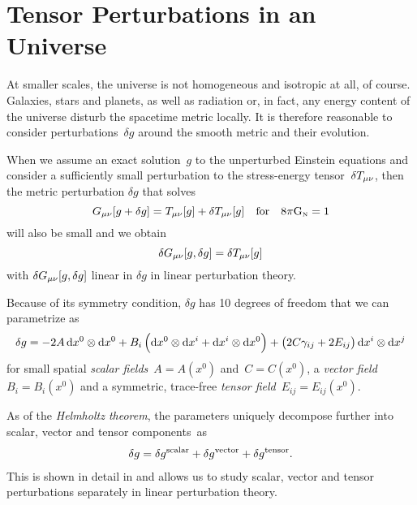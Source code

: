 \documentclass[12pt,parskip=half]{scrreprt}
\newcommand{\todocheck}[1]{\todo[color=blue!40]{#1}}
\begin{document}
\section{Tensor Perturbations in an \FLRW Universe}\label{sec:perturb}

At smaller scales, the universe is not homogeneous and isotropic at all, of course. Galaxies, stars and planets, as well as radiation or, in fact, any energy content of the universe disturb the spacetime metric locally. It is therefore reasonable to consider perturbations~\(\delta g\) around the smooth \FLRW metric and their evolution.

When we assume an exact solution~\(g\) to the unperturbed Einstein equations and consider a sufficiently small perturbation to the stress-energy tensor~\(\delta T_{\mu \nu}\), then the metric perturbation \(\delta g\) that solves
\begin{equation}
	G_{\mu \nu}[g + \delta g] = T_{\mu \nu}[g] + \delta T_{\mu \nu}[g] \quad \text{for} \quad 8 \pi \mathrm{G}_\textnormal{\tiny{N}} = 1
\end{equation}
will also be small and we obtain \autocite{Schulz}
\begin{equation}\label{eq:perturbed_einstein_eqns}
	\delta G_{\mu \nu}[g,\delta g] = \delta T_{\mu \nu}[g]
\end{equation}
with \(\delta G_{\mu \nu}[g,\delta g]\) linear in \(\delta g\) in linear perturbation theory.

Because of its symmetry condition, \(\delta g\) has 10 degrees of freedom that we can parametrize as \autocite{Schulz}
\begin{align}
	\delta g = -2A \dif{x^0}\otimes\dif{x^0} + B_i\del{\dif{x^0}\otimes\dif{x^i}+\dif{x^i}\otimes\dif{x^0}} + \del{2C\gamma_{ij} + 2E_{ij}}\dif{x^i}\otimes\dif{x^j}
\end{align}\todocheck{notation}
for small spatial \emph{scalar fields}~\(A=A(x^0)\) and~\(C=C(x^0)\), a \emph{vector field}~\(B_i=B_i(x^0)\) and a symmetric, trace-free \emph{tensor field}~\(E_{ij}=E_{ij}(x^0)\).

As of the \emph{Helmholtz theorem}, the parameters uniquely decompose further into scalar, vector and tensor components~as
\begin{align}
	\delta g = \delta g^{\mathrm{scalar}} + \delta g^{\mathrm{vector}} + \delta g^{\mathrm{tensor}} \mathpunct{.}
\end{align}
This is shown in detail in  and allows us to study scalar, vector and tensor perturbations separately in linear perturbation theory.
\end{document}
